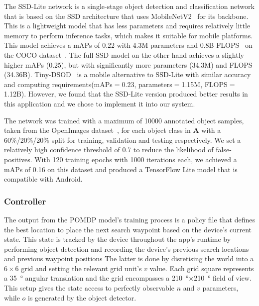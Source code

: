 \documentclass[runningheads]{llncs}
\newcommand\todo[1]{\textcolor{red}{#1}}
\begin{document}
The SSD-Lite network is a single-stage object detection and classification network that is based on the SSD architecture that uses MobileNetV2~\cite{sandler2018mobilenetv2} for its backbone.
This is a lightweight model that has less parameters and requires relatively little memory to perform inference tasks, which makes it suitable for mobile platforms. 
This model achieves a mAPs of 0.22 with 4.3M parameters and 0.8B FLOPS~\cite{li2018tinydsod} on the COCO dataset~\cite{lin2014microsoft}. 
The full SSD model on the other hand achieves a slightly higher mAPs (0.25), but with significantly more parameters (34.3M) and FLOPS (34.36B).
Tiny-DSOD~\cite{li2018tinydsod} is a mobile alternative to SSD-Lite with similar accuracy and computing requirements(mAPs$=0.23$, parameters$=$1.15M, FLOPS$=$1.12B).
However, we found that the SSD-Lite version produced better results in this application and we chose to implement it into our system.

The network was trained with a maximum of 10000 annotated object samples, taken from the OpenImages dataset~\cite{openimages}, for each object class in $\mathbf{A}$ with a 60\%/20\%/20\% split for training, validation and testing respectively.
We set a relatively high confidence threshold of 0.7 to reduce the likelihood of false-positives.
With 120 training epochs with 1000 iterations each, we achieved a mAPs of 0.16 on this dataset and produced a TensorFlow Lite model that is compatible with Android. 

\subsubsection{Controller}

The output from the POMDP model's training process is a policy file that defines the best location to place the next search waypoint based on the device's current state.
This state is tracked by the device throughout the app's runtime by performing object detection and recording the device's previous search locations and previous waypoint positions
The latter is done by disretising the world into a $6\times6$ grid and setting the relevant grid unit's $v$ value.
Each grid square represents a \SI{35}{\degree} angular translation and the grid encompasses a \SI{210}{\degree}$\times$\SI{210}{\degree} field of view. 
This setup gives the state access to perfectly observable $n$ and $v$ parameters, while $o$ is generated by the object detector. 
\end{document}
